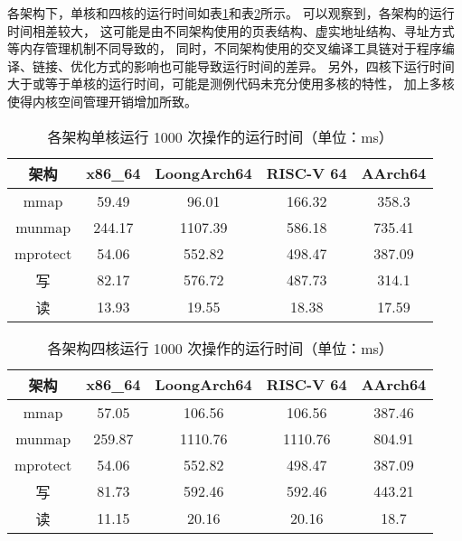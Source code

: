 

各架构下，单核和四核的运行时间如表\ref{tab:time-smp1}和表\ref{tab:time-smp4}所示。
可以观察到，各架构的运行时间相差较大，
这可能是由不同架构使用的页表结构、虚实地址结构、寻址方式等内存管理机制不同导致的，
同时，不同架构使用的交叉编译工具链对于程序编译、链接、优化方式的影响也可能导致运行时间的差异。
另外，四核下运行时间大于或等于单核的运行时间，可能是测例代码未充分使用多核的特性，
加上多核使得内核空间管理开销增加所致。

\begin{table}
    \centering
    \caption{各架构单核运行 1000 次操作的运行时间（单位：ms）}
    \begin{tabular}{ccccc}
        \toprule
        架构 & x86\_64 & LoongArch64  & RISC-V 64  & AArch64  \\ 
        \midrule
        mmap & 59.49 & 96.01 & 166.32 & 358.3 \\
        munmap & 244.17 & 1107.39 & 586.18 & 735.41 \\
        mprotect & 54.06 & 552.82 & 498.47 & 387.09 \\ 
        写 & 82.17 & 576.72 & 487.73 & 314.1 \\ 
        读 & 13.93 & 19.55 & 18.38 & 17.59 \\ 
        \bottomrule
    \end{tabular}
    \label{tab:time-smp1}
\end{table}

\begin{table}
    \centering
    \caption{各架构四核运行 1000 次操作的运行时间（单位：ms）}
    \begin{tabular}{ccccc}
        \toprule
        架构 & x86\_64 & LoongArch64  & RISC-V 64  & AArch64  \\ 
        \midrule
        mmap & 57.05 & 106.56 & 106.56 & 387.46  \\
        munmap & 259.87 & 1110.76 & 1110.76 & 804.91  \\
        mprotect & 54.06 & 552.82 & 498.47 & 387.09 \\ 
        写 & 81.73 & 592.46 & 592.46 & 443.21  \\
        读 & 11.15 & 20.16 & 20.16 & 18.7  \\
        \bottomrule
    \end{tabular}
    \label{tab:time-smp4}
\end{table}

